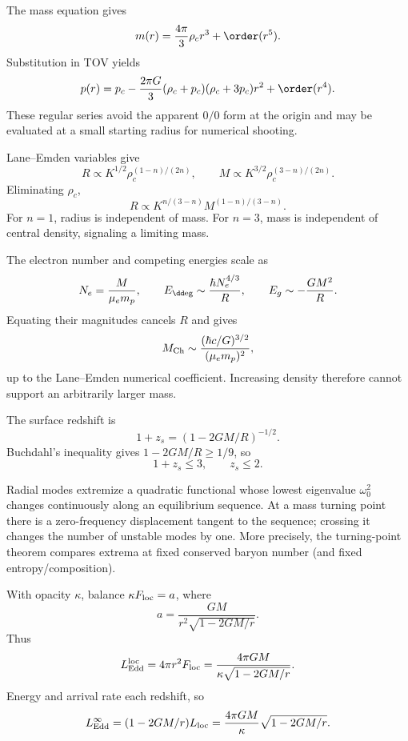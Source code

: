 \begin{solution}
The mass equation gives
\[
m(r)=\frac{4\pi}{3}\rho_c r^3+\order(r^5).
\]
Substitution in TOV yields
\[
p(r)=p_c-\frac{2\pi G}{3}
(\rho_c+p_c)(\rho_c+3p_c)r^2+\order(r^4).
\]
These regular series avoid the apparent \(0/0\) form at the origin and may be
evaluated at a small starting radius for numerical shooting.
\end{solution}

\begin{solution}
Lane--Emden variables give
\[
R\propto K^{1/2}\rho_c^{(1-n)/(2n)},\qquad
M\propto K^{3/2}\rho_c^{(3-n)/(2n)}.
\]
Eliminating \(\rho_c\),
\[
R\propto K^{n/(3-n)}M^{(1-n)/(3-n)}.
\]
For \(n=1\), radius is independent of mass.  For \(n=3\), mass is independent
of central density, signaling a limiting mass.
\end{solution}

\begin{solution}
The electron number and competing energies scale as
\[
N_e=\frac{M}{\mu_em_p},\qquad
E_{\rm \dd eg}\sim\frac{\hbar N_e^{4/3}}R,\qquad
E_g\sim-\frac{GM^2}R.
\]
Equating their magnitudes cancels \(R\) and gives
\[
M_{\rm Ch}\sim
\frac{(\hbar c/G)^{3/2}}{(\mu_em_p)^2},
\]
up to the Lane--Emden numerical coefficient.  Increasing density therefore
cannot support an arbitrarily larger mass.
\end{solution}

\begin{solution}
The surface redshift is
\[
1+z_s=(1-2GM/R)^{-1/2}.
\]
Buchdahl's inequality gives \(1-2GM/R\geq1/9\), so
\[
1+z_s\leq3,\qquad z_s\leq2.
\]
\end{solution}

\begin{solution}
Radial modes extremize a quadratic functional whose lowest eigenvalue
\(\omega_0^2\) changes continuously along an equilibrium sequence.  At a mass
turning point there is a zero-frequency displacement tangent to the sequence;
crossing it changes the number of unstable modes by one.  More precisely, the
turning-point theorem compares extrema at fixed conserved baryon number (and
fixed entropy/composition).
\end{solution}

\begin{solution}
With opacity \(\kappa\), balance \(\kappa F_{\rm loc}=a\), where
\[
a=\frac{GM}{r^2\sqrt{1-2GM/r}}.
\]
Thus
\[
L_{\rm Edd}^{\rm loc}
=4\pi r^2F_{\rm loc}
=\frac{4\pi GM}{\kappa\sqrt{1-2GM/r}}.
\]
Energy and arrival rate each redshift, so
\[
L_{\rm Edd}^{\infty}
=(1-2GM/r)L_{\rm loc}
=\frac{4\pi GM}{\kappa}\sqrt{1-2GM/r}.
\]
\end{solution}

